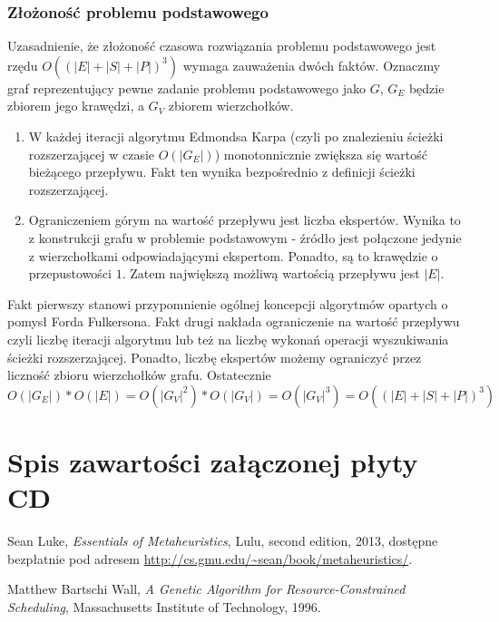 \documentclass[12pt,a4paper]{article}
\theoremstyle{definition}
\begin{document}
\subsubsection{Złożoność problemu podstawowego} \label{boundedflow}
Uzasadnienie, że złożoność czasowa rozwiązania problemu podstawowego jest rzędu $O((|E| + |S| + |P|)^3)$ wymaga zauważenia dwóch faktów. Oznaczmy graf reprezentujący pewne zadanie problemu podstawowego jako $G$, $G_E$ będzie zbiorem jego krawędzi, a $G_V$ zbiorem wierzchołków.
\begin{enumerate}
	\item W każdej iteracji algorytmu Edmondsa Karpa (czyli po znalezieniu ścieżki rozszerzającej w czasie $O(|G_E|)$) monotonnicznie zwiększa się wartość bieżącego przepływu. Fakt ten wynika bezpośrednio z definicji ścieżki rozszerzającej.
	\item Ograniczeniem górym na wartość przepływu jest liczba ekspertów. Wynika to z konstrukcji grafu w problemie podstawowym - źródło jest połączone jedynie z wierzchołkami odpowiadającymi ekspertom. Ponadto, są to krawędzie o przepustowości $1$. Zatem największą możliwą wartością przepływu jest $|E|$.
\end{enumerate}
Fakt pierwszy stanowi przypomnienie ogólnej koncepcji algorytmów opartych o pomysł Forda Fulkersona. Fakt drugi nakłada ograniczenie na wartość przepływu czyli liczbę iteracji algorytmu lub też na liczbę wykonań operacji wyszukiwania ścieżki rozszerzającej. Ponadto, liczbę ekspertów możemy ograniczyć przez liczność zbioru wierzchołków grafu. Ostatecznie
$$O(|G_E|) * O(|E|) = O(|G_V|^2) * O(|G_V|) = O(|G_V|^3) = O((|E| + |S| + |P|)^3)$$

\newpage
\section{Spis zawartości załączonej płyty CD}

\newpage
\begin{thebibliography}{9}
	Sean Luke,
	\emph{Essentials of Metaheuristics},
	Lulu,
	second edition,
	2013,
	dostępne bezpłatnie pod adresem \url{http://cs.gmu.edu/~sean/book/metaheuristics/}.

	Matthew Bartschi Wall,
	\emph{A Genetic Algorithm for Resource-Constrained Scheduling},
	Massachusetts Institute of Technology,
	1996.
\end{thebibliography}
\end{document}
